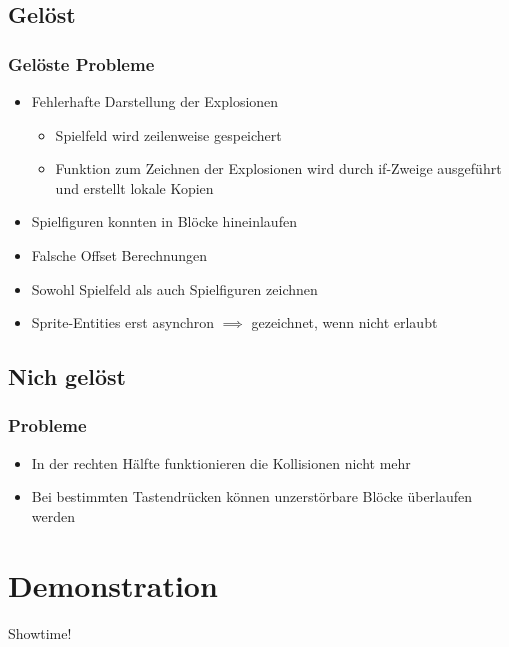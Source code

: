 \documentclass[18pt]{beamer}
\begin{document}
	\subsection{Gelöst}
	\begin{frame}
		\frametitle{Gelöste Probleme}
		\begin{itemize}
			\item Fehlerhafte Darstellung der Explosionen
			\begin{itemize}
				\item Spielfeld wird zeilenweise gespeichert
				\item Funktion zum Zeichnen der Explosionen wird durch if-Zweige ausgeführt und erstellt lokale Kopien
			\end{itemize}
			\item Spielfiguren konnten in Blöcke hineinlaufen
			\item Falsche Offset Berechnungen
			\item Sowohl Spielfeld als auch Spielfiguren zeichnen
			\item Sprite-Entities erst asynchron $\implies$ gezeichnet, wenn nicht erlaubt
		\end{itemize}
	\end{frame}
	
	\subsection{Nich gelöst}
	\begin{frame}
		\frametitle{Probleme}
		\begin{itemize}
			\item In der rechten Hälfte funktionieren die Kollisionen nicht mehr
			\item Bei bestimmten Tastendrücken können unzerstörbare Blöcke überlaufen werden
		\end{itemize}
\end{frame}

\section{Demonstration}
	\begin{frame}
		\centering \huge	Showtime!
\end{frame}
		
\end{document}
